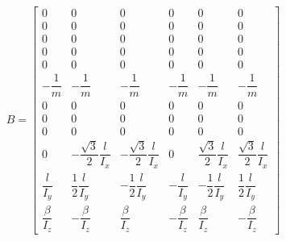 \begin{equation}
B = \left[ \begin {array}{cccccc} 0&0&0&0&0&0\\  0&0&0&0
&0&0\\  0&0&0&0&0&0\\  0&0&0&0&0&0
\\  0&0&0&0&0&0\\   -\dfrac{1}{m}& -\dfrac{1}{m}& -\dfrac{1}{m}& -\dfrac{1}{m}& -\dfrac{1}{m}& -\dfrac{1}{m}\\  0&0&0&0
&0&0\\  0&0&0&0&0&0\\  0&0&0&0&0&0
\\  0&-\dfrac{\sqrt{3}}{2}\dfrac{l}{I_x}&-\dfrac{\sqrt{3}}{2}\dfrac{l}{I_x}&0&
\dfrac{\sqrt{3}}{2}\dfrac{l}{I_x}&\dfrac{\sqrt{3}}{2}\dfrac{l}{I_x}\\  \dfrac{l}{I_y}&\dfrac{1}{2}\dfrac{l}{I_y}&-\dfrac{1}{2}\dfrac{l}{I_y}&-\dfrac{l}{I_y}&-\dfrac{1}{2}\dfrac{l}{I_y}&\dfrac{1}{2}\dfrac{l}{I_y}
\\  \dfrac{\beta}{I_z}&-\dfrac{\beta}{I_z}&\dfrac{\beta}{I_z}&-\dfrac{\beta}{I_z}&\dfrac{\beta}{I_z}&-\dfrac{\beta}{I_z} \end {array} \right]
\end{equation}
\renewcommand{\arraystretch}{1.75}

